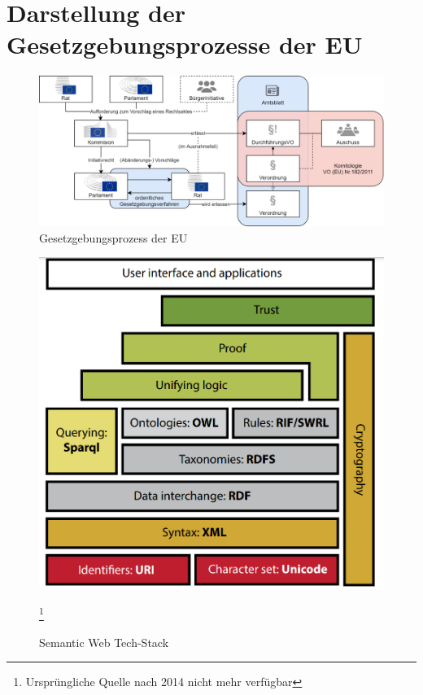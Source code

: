 
    \section{Darstellung der Gesetzgebungsprozesse der EU}
    
    \begin{figure}[h]
        \centering
        \includegraphics[width=\linewidth]{gfx/Gesegebungsprozess.png}
        \caption{Gesetzgebungsprozess der EU}
        \label{fig:europeg}
    \end{figure}


    
    \begin{figure}[h]
        \centering
        \includegraphics[width=.75\linewidth]{gfx/semantic_web_cake.png}
        \caption{Semantic Web Tech-Stack }\cite[10]{eu_cellar}\footnote{Ursprüngliche Quelle nach 2014 nicht mehr verfügbar}
        \label{fig:semantic}
    \end{figure}


    